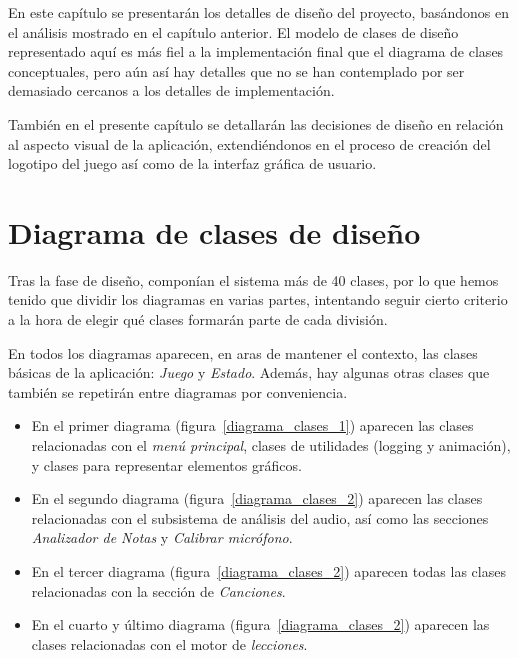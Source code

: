 En este capítulo se presentarán los detalles de diseño del proyecto, basándonos
en el análisis mostrado en el capítulo anterior. El modelo de clases de diseño
representado aquí es más fiel a la implementación final que el diagrama de
clases conceptuales, pero aún así hay detalles que no se han contemplado por ser
demasiado cercanos a los detalles de implementación.

También en el presente capítulo se detallarán las decisiones de diseño en
relación al aspecto visual de la aplicación, extendiéndonos en el proceso de
creación del logotipo del juego así como de la interfaz gráfica de usuario.

\section{Diagrama de clases de diseño}

Tras la fase de diseño, componían el sistema más de 40 clases, por lo que hemos
tenido que dividir los diagramas en varias partes, intentando seguir cierto
criterio a la hora de elegir qué clases formarán parte de cada división.

En todos los diagramas aparecen, en aras de mantener el contexto, las clases
básicas de la aplicación: \textit{Juego} y \textit{Estado}. Además, hay algunas
otras clases que también se repetirán entre diagramas por conveniencia.

\begin{itemize}
\item En el primer diagrama (figura~\ref{diagrama_clases_1}) aparecen las clases
  relacionadas con el \textit{menú principal}, clases de utilidades (logging y
  animación), y clases para representar elementos gráficos.
\item En el segundo diagrama (figura~\ref{diagrama_clases_2}) aparecen las
  clases relacionadas con el subsistema de análisis del audio, así como las
  secciones \textit{Analizador de Notas} y \textit{Calibrar micrófono}.
\item En el tercer diagrama (figura~\ref{diagrama_clases_2}) aparecen todas las
  clases relacionadas con la sección de \textit{Canciones}.
\item En el cuarto y último diagrama (figura~\ref{diagrama_clases_2}) aparecen
  las clases relacionadas con el motor de \textit{lecciones}.
\end{itemize}

